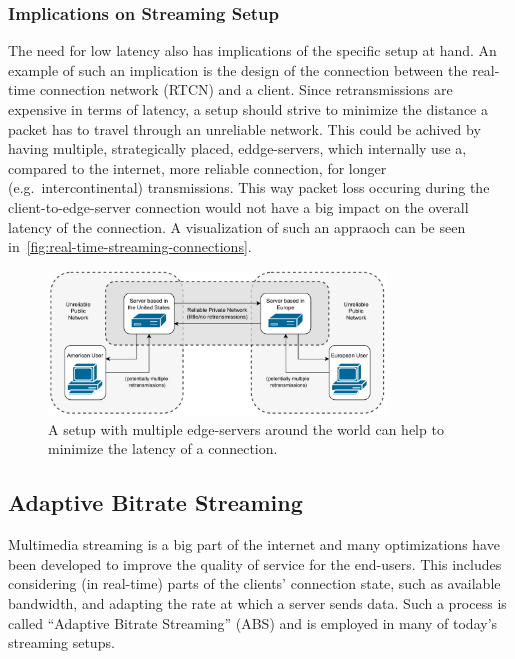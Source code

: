 \subsubsection{Implications on Streaming Setup}
The need for low latency also has implications of the specific setup at hand.
An example of such an implication is the design of the connection between the 
real-time connection network (RTCN) and a client.
Since retransmissions are expensive in terms of latency, a setup should strive to minimize 
the distance a packet has to travel through an unreliable network.
This could be achived by having multiple, strategically placed, eddge-servers, which internally use 
a, compared to the internet, more reliable connection, for longer (e.g.~intercontinental) transmissions.
This way packet loss occuring during the client-to-edge-server connection would not have a big 
impact on the overall latency of the connection.
A visualization of such an appraoch can be seen in~\autoref{fig:real-time-streaming-connections}.

\vspace{0.5cm}
\begin{figure}[H]
    \centering
    \includegraphics[width=0.8\textwidth]{figures/02_background/real-time-streaming-connections.drawio.pdf}
    \caption[Real-time streaming connections]{A setup with multiple edge-servers around the world
    can help to minimize the latency of a connection.}\label{fig:real-time-streaming-connections}
\end{figure}

\subsection{Adaptive Bitrate Streaming}\label{subsec:adaptive_bitrate_streaming}
Multimedia streaming is a big part of the internet and many optimizations have
been developed to improve the quality of service for the end-users.
This includes considering (in real-time) parts of the clients' connection state, 
such as available bandwidth, and adapting the rate at which a server sends data.
Such a process is called ``Adaptive Bitrate Streaming'' (ABS) and is employed in many 
of today's streaming setups.

